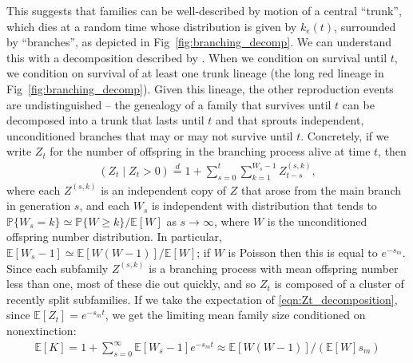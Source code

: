 \documentclass[10pt,letterpaper]{article}
\newcommand{\citet}[1]{\cite{#1}}
\renewcommand{\P}{\mathbb{P}}
\newcommand{\E}{\mathbb{E}}
\newcommand{\deq}{\stackrel{\scriptscriptstyle{d}}{=}}
\begin{document}
This suggests that families can be well-described by motion of a central ``trunk'',
which dies at a random time whose distribution is given by $k_e(t)$,
surrounded by ``branches'',
as depicted in Fig~\ref{fig:branching_decomp}.
We can understand this with a decomposition described by \citet{geiger1999elementary}.
When we condition on survival until $t$, we condition on survival of at least one trunk lineage
(the long red lineage in Fig~\ref{fig:branching_decomp}).
Given this lineage, the other reproduction events are undistinguished --
the genealogy of a family that survives until $t$
can be decomposed into a trunk that lasts until $t$
and that sprouts independent, unconditioned branches that may or may not survive until $t$.
Concretely, if we write $Z_t$ for the number of offspring in the branching process alive at time $t$,
then
\begin{align} \label{eqn:Zt_decomposition}
  \left( Z_t \; \vert \; Z_t>0 \right) \deq 1 + \sum_{s=0}^t \sum_{k=1}^{W_s-1} Z^{(s,k)}_{t-s},
\end{align}
where each $Z^{(s,k)}$ is an independent copy of $Z$ 
that arose from the main branch in generation $s$,
and each $W_s$ is independent with distribution 
that tends to $\P\{W_s=k\} \simeq \P\{W\ge k\}/\E[W]$ as $s \to \infty$,
where $W$ is the unconditioned offspring number distribution.  
In particular, $\E[W_s-1] \simeq \E[W(W-1)]/\E[W]$;
if $W$ is Poisson then this is equal to $e^{-s_m}$.
Since each subfamily $Z^{(s,k)}$ is a branching process with mean offspring number less than one,
most of these die out quickly,
and so $Z_t$ is composed of a cluster of recently split subfamilies.
If we take the expectation of \eqref{eqn:Zt_decomposition},
since $\E[Z_t] = e^{-s_m t}$,
we get the limiting mean family size conditioned on nonextinction:
\begin{align} \label{eqn:mean_K}
    \E[K] 
    = 1 + \sum_{s=0}^\infty \E[W_s-1] e^{-s_m t}
    \approx \E[W(W-1)] / ( \E[W] s_m  )
\end{align}
\end{document}

